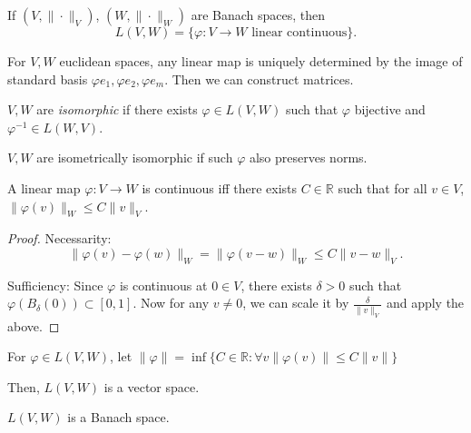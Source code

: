 \begin{definition}
	 If $(V, \|\cdot\|_V)$, $(W, \|\cdot\|_W)$ are Banach spaces, then
	 \[
	 	L(V, W) = \{\varphi: V \to  W \text{ linear continuous}\} 
	 .\] 
\end{definition}

\begin{example}
	For $V, W$ euclidean spaces, any linear map is uniquely determined by the image of standard basis $\varphi e_1, \varphi e_2 , \varphi e_m$. Then we can construct matrices.
\end{example}

\begin{definition}
	$V, W$ are \textit{isomorphic} if there exists $\varphi \in L(V, W)$ such that $\varphi$ bijective and $\varphi^{-1} \in L(W, V)$. 

	$V, W$ are isometrically isomorphic if such $\varphi$ also preserves norms.
\end{definition}

\begin{proposition}
	A linear map $\varphi:V \to W$ is continuous iff there exists $C \in \mathbb{R}$ such that for all $v \in V$, $\|\varphi(v)\|_W\le C \|v\|_V$.
\end{proposition}
\begin{proof}
	Necessarity:
	\[
		\|\varphi(v) - \varphi(w)\|_W = \|\varphi(v - w)\|_W \le C \|v - w\|_V
	.\] 

	Sufficiency:
	Since $\varphi$ is continuous at $0 \in V$, there exists $\delta>0$ such that $\varphi(B_\delta(0)) \subset [0,1]$.
	Now for any $v \neq 0$, we can scale it by $\frac{\delta}{\|v\|_V}$ and apply the above.
\end{proof}

\begin{definition}
	For $\varphi \in L(V, W)$, let $\|\varphi\| = \inf \{C \in \mathbb{R}: \forall  v \|\varphi(v)\|\le C \|v\|\} $
\end{definition}
Then, $L(V, W)$ is a vector space.


\begin{theorem}
	$L(V, W)$ is a Banach space.
\end{theorem}

